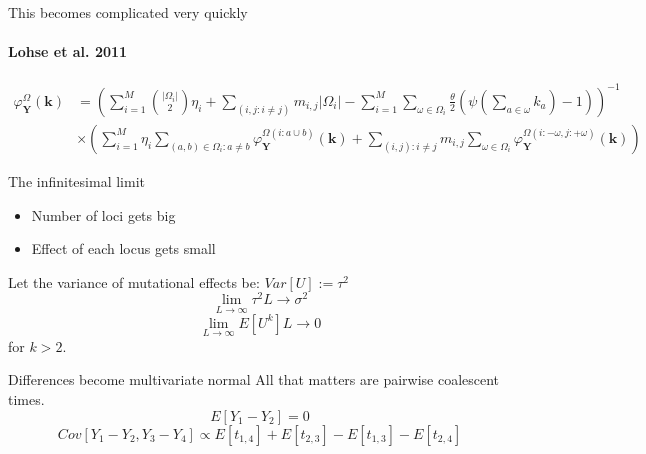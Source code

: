 \documentclass{beamer}
\newcommand{\T}{\frac{\theta}{2}}
\begin{document}
\begin{frame}{This becomes complicated very quickly}
  \framesubtitle{{\small Lohse et al. 2011}}
  \small
  \begin{align}
    \varphi_{\mathbf{Y}}^{\Omega}(\mathbf{k}) &=
                                                \left( \sum_{i=1}^M \binom{|\Omega_i|}{2}\eta_i  + \sum_{(i,j:i \neq j)} m_{i,j}|\Omega_i| -
                                                \sum_{i=1}^M \sum_{\omega \in \Omega_i} \T\left( \psi\left(\sum_{a \in \omega}k_{a}\right) -1\right)\right)^{-1} \nonumber \\ 
                                              &\times \left( \sum_{i=1}^M \eta_i \sum_{(a,b) \in \Omega_i:a \neq b}
                                                \varphi_{\mathbf{Y}}^{\Omega(i:a \cup b)}(\mathbf{k}) + 
                                                \sum_{(i,j):i\neq j}m_{i,j}\sum_{\omega \in \Omega_i} \varphi_{\mathbf{Y}}^{\Omega\left( i :-\omega, j: + \omega \right)}(\mathbf{k})\right) \nonumber 
  \end{align}
  \normalsize
\end{frame}

\begin{frame}{The infinitesimal limit}
  \begin{itemize}
  \item Number of loci gets big
  \item Effect of each locus gets small
  \end{itemize}
  Let the variance of mutational effects be: $Var[U]:=\tau^2$
  \begin{equation}
    \label{eq:lim}
    \lim_{L \to \infty}\tau^2L \to \sigma^2 \nonumber
  \end{equation}
  \begin{equation}
    \label{eq:lim2}
    \lim_{L \to \infty}E[U^k]L \to 0 \nonumber 
  \end{equation}
  for $k>2$.
\end{frame}

\begin{frame}{Differences become multivariate normal}
  All that matters are pairwise coalescent times.
  \begin{equation}
    \label{eq:mean}
    E[Y_1-Y_2]=0
  \end{equation}
  \begin{equation}
    \label{eq:covcoal}
    Cov[Y_1-Y_2,Y_3-Y_4] \propto E[t_{1,4}] + E[t_{2,3}] - E[t_{1,3}] - E[t_{2,4}] \nonumber
  \end{equation}
\end{frame}
\end{document}
